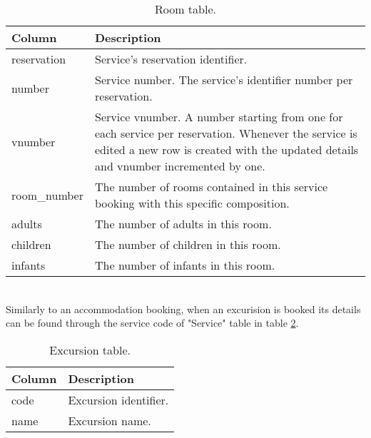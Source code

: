 \begin{table}[h!]
\begin{center}
\begin{tabular}{l | p{12cm}}
\textcolor{theme}{\textbf{Column}} & \textcolor{theme}{\textbf{Description}}\\
\hline
reservation & Service's reservation identifier.\\
\hline
number & Service number. The service's identifier number per reservation.\\
\hline
vnumber & Service vnumber. A number starting from one for each service per reservation. Whenever the service is edited a new row is created with the updated details and vnumber incremented by one.\\
\hline
room\_number & The number of rooms contained in this service booking with this specific composition.\\
\hline
adults & The number of adults in this room.\\
\hline
children & The number of children in this room.\\
\hline
infants & The number of infants in this room.\\
\hline
\end{tabular}
\caption{Room table.}
\label{tab:room}
\end{center}
\end{table}
\\
Similarly to an accommodation booking, when an excurision is booked its details can be found through the service code of "Service" table in table \ref{tab:excursion}. \\
\begin{table}[h!]
\begin{center}
\begin{tabular}{l | p{12cm}}
\textcolor{theme}{\textbf{Column}} & \textcolor{theme}{\textbf{Description}}\\
\hline
code & Excursion identifier.\\
\hline
name & Excursion name.\\
\hline
\end{tabular}
\caption{Excursion table.}
\label{tab:excursion}
\end{center}
\end{table}
\\
